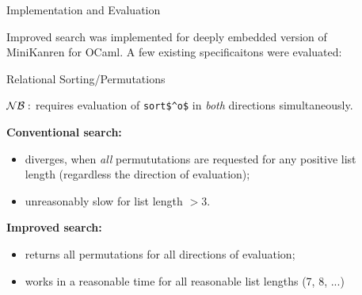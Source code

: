 \documentclass[final,20pt]{beamer}
\begin{document}
\begin{frame}[t]
\begin{columns}[t]
\begin{column}{\onecolwid}
  \end{column}

  \begin{column}{\sepwid}\end{column} %

  \begin{column}{\onecolwid} %
   
    \begin{block}{Implementation and Evaluation}
    
    \vskip5mm
     
     Improved search was implemented for deeply embedded version of MiniKanren for OCaml. A few
existing specificaitons were evaluated:
     \bigskip

     \begin{exampleblock}{Relational Sorting/Permutations}
        \justifying
        
        \bigskip

 

        
        \bigskip
        $\cal{NB}:$ requires evaluation of \lstinline|sort$^o$| in \emph{both} directions simultaneously.

        \bigskip
        \justifying
        \textbf{Conventional search:}
        \begin{itemize}
           \justifying
           \item diverges, when \emph{all} permututations are requested for 
                 any positive list length (regardless the direction of evaluation);
           \item unreasonably slow for list length $>3$. 
        \end{itemize}
        \textbf{Improved search:}
        \begin{itemize}
           \justifying
           \item returns all permutations for all directions of evaluation;
           \item works in a reasonable time for all reasonable list lengths (7, 8, ...)
        \end{itemize}
	 \end{exampleblock}


\end{block}
\end{column}
\end{columns}
\end{frame}
\end{document}
